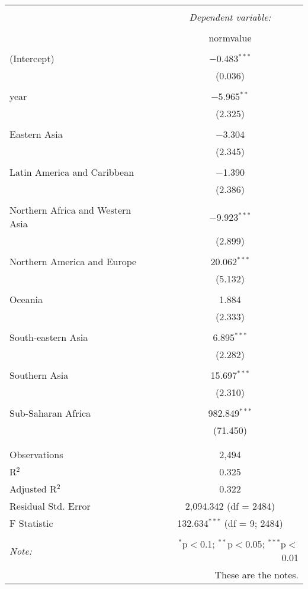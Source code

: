 
\begin{table}[!htbp] \centering 
  \caption{} 
  \label{} 
\footnotesize 
\begin{tabular}{@{\extracolsep{5pt}}lc} 
\\[-1.8ex]\hline 
\hline \\[-1.8ex] 
 & \multicolumn{1}{c}{\textit{Dependent variable:}} \\ 
\cline{2-2} 
\\[-1.8ex] & normvalue \\ 
\hline \\[-1.8ex] 
 (Intercept) & $-$0.483$^{***}$ \\ 
  & (0.036) \\ 
  & \\ 
 year & $-$5.965$^{**}$ \\ 
  & (2.325) \\ 
  & \\ 
 Eastern Asia & $-$3.304 \\ 
  & (2.345) \\ 
  & \\ 
 Latin America and Caribbean & $-$1.390 \\ 
  & (2.386) \\ 
  & \\ 
 Northern Africa and Western Asia & $-$9.923$^{***}$ \\ 
  & (2.899) \\ 
  & \\ 
 Northern America and Europe & 20.062$^{***}$ \\ 
  & (5.132) \\ 
  & \\ 
 Oceania & 1.884 \\ 
  & (2.333) \\ 
  & \\ 
 South-eastern Asia & 6.895$^{***}$ \\ 
  & (2.282) \\ 
  & \\ 
 Southern Asia & 15.697$^{***}$ \\ 
  & (2.310) \\ 
  & \\ 
 Sub-Saharan Africa & 982.849$^{***}$ \\ 
  & (71.450) \\ 
  & \\ 
\hline \\[-1.8ex] 
Observations & 2,494 \\ 
R$^{2}$ & 0.325 \\ 
Adjusted R$^{2}$ & 0.322 \\ 
Residual Std. Error & 2,094.342 (df = 2484) \\ 
F Statistic & 132.634$^{***}$ (df = 9; 2484) \\ 
\hline 
\hline \\[-1.8ex] 
\textit{Note:}  & \multicolumn{1}{r}{$^{*}$p$<$0.1; $^{**}$p$<$0.05; $^{***}$p$<$0.01} \\ 
 & \multicolumn{1}{r}{These are the notes.} \\ 
\end{tabular} 
\end{table} 
